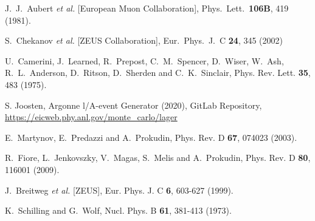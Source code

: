 \documentclass[prd,amsmath,twocolumn,floatfix,amssymb, preprintnumbers, linenumbers,nofootinbib, superscriptaddress]{revtex4}
\begin{document}
\begin{thebibliography}{99}
  J.~J.~Aubert {\it et al.} [European Muon Collaboration],
  Phys.\ Lett.\  {\bf 106B}, 419 (1981).
 


  S.~Chekanov {\it et al.} [ZEUS Collaboration],
  Eur.\ Phys.\ J.\ C \textbf{24}, 345 (2002)


U.~Camerini, J.~Learned, R.~Prepost, C.~M.~Spencer, D.~Wiser, W.~Ash, R.~L.~Anderson, D.~Ritson, D.~Sherden and C.~K.~Sinclair,
Phys. Rev. Lett. \textbf{35}, 483 (1975).



S. Joosten, Argonne l/A-event Generator (2020), GitLab Repository,
\url{https://eicweb.phy.anl.gov/monte_carlo/lager}


E.~Martynov, E.~Predazzi and A.~Prokudin,
Phys. Rev. D \textbf{67}, 074023 (2003).

R.~Fiore, L.~Jenkovszky, V.~Magas, S.~Melis and A.~Prokudin,
Phys. Rev. D \textbf{80}, 116001 (2009). 

J.~Breitweg \textit{et al.} [ZEUS],
Eur. Phys. J. C \textbf{6}, 603-627 (1999). 


K.~Schilling and G.~Wolf,
Nucl. Phys. B \textbf{61}, 381-413 (1973).


\end{thebibliography}
\end{document}
